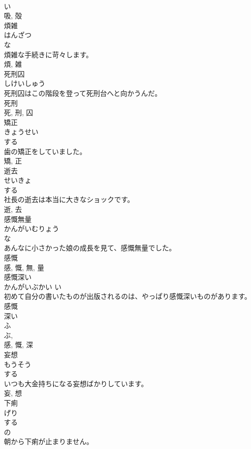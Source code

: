 \documentclass[8pt]{extreport}
\begin{document}
\begin{CJK}{UTF8}{min}
\\	い 
\\	吸, 殻	
\\	煩雑	
\\	はんざつ	
\\	な 
\\	煩雑な手続きに苛々します。	
\\	煩, 雑	
\\	死刑囚	
\\	しけいしゅう	
\\	死刑囚はこの階段を登って死刑台へと向かうんだ。	
\\	死刑 
\\	死, 刑, 囚	
\\	矯正	
\\	きょうせい	
\\	する 
\\	歯の矯正をしていました。	
\\	矯, 正	
\\	逝去	
\\	せいきょ	
\\	する 
\\	社長の逝去は本当に大きなショックです。	
\\	逝, 去	
\\	感慨無量	
\\	かんがいむりょう	
\\	な 
\\	あんなに小さかった娘の成長を見て、感慨無量でした。	
\\	感慨 
\\	感, 慨, 無, 量	
\\	感慨深い	
\\	かんがいぶかい	い 
\\	初めて自分の書いたものが出版されるのは、やっぱり感慨深いものがあります。	
\\	感慨 
\\	深い 
\\	ふ 
\\	ぶ, 
\\	感, 慨, 深	
\\	妄想	
\\	もうそう	
\\	する 
\\	いつも大金持ちになる妄想ばかりしています。	
\\	妄, 想	
\\	下痢	
\\	げり	
\\	する 
\\	の 
\\	朝から下痢が止まりません。	

\end{CJK}
\end{document}
